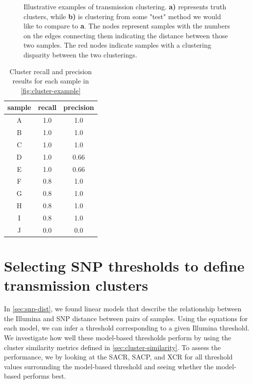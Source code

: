 \begin{figure}
\begin{subfigure}[b]{0.4\textwidth}
         \caption{}
         \label{fig:example-test}
     \end{subfigure}
        \caption{Illustrative examples of transmission clustering. \textbf{a)} represents truth clusters, while \textbf{b)} is clustering from some "test" method we would like to compare to \textbf{a}. The nodes represent samples with the numbers on the edges connecting them indicating the distance between those two samples. The red nodes indicate samples with a clustering disparity between the two clusterings.}
        \label{fig:cluster-example}
\end{figure}

\begin{table}
\centering
\begin{tabular}{|c|c|c|}
sample & recall & precision \\
\hline
A      & 1.0    & 1.0       \\
B      & 1.0    & 1.0       \\
C      & 1.0    & 1.0       \\
D      & 1.0    & 0.66      \\
E      & 1.0    & 0.66      \\
F      & 0.8    & 1.0       \\
G      & 0.8    & 1.0       \\
H      & 0.8    & 1.0       \\
I      & 0.8    & 1.0       \\
J      & 0.0      & 0.0        
\end{tabular}
\caption{Cluster recall and precision results for each sample in \autoref{fig:cluster-example}}
\label{tab:cluster-example}
\end{table}


\section{Selecting \ont{} SNP thresholds to define transmission clusters}
\label{app:dist-sweep}

In \autoref{sec:snp-dist}, we found linear models that describe the relationship between the Illumina and \ont{} SNP distance between pairs of samples. Using the equations for each model, we can infer a \ont{} threshold corresponding to a given Illumina threshold. We investigate how well these model-based thresholds perform by using the cluster similarity metrics defined in \autoref{sec:cluster-similarity}. To assess the performance, we by looking at the SACR, SACP, and XCR for all threshold values surrounding the model-based threshold and seeing whether the model-based performs best.

